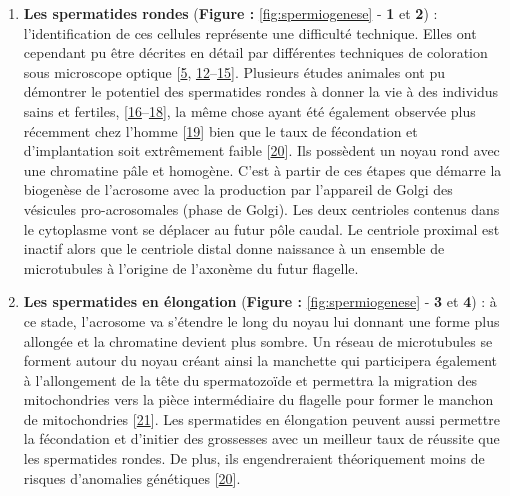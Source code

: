 \documentclass[12pt,twoside]{reedthesis}
\theoremstyle{definition}
\theoremstyle{definition}
\theoremstyle{remark}
\begin{document}
  \begin{enumerate}
  \def\labelenumi{\arabic{enumi}.}
  \item
    \textbf{Les spermatides rondes} (\textbf{Figure :
    }\ref{fig:spermiogenese} - \textbf{1} et \textbf{2}) :
    l'identification de ces cellules représente une difficulté technique.
    Elles ont cependant pu être décrites en détail par différentes
    techniques de coloration sous microscope optique
    {[}\protect\hyperlink{ref-Clermont1963}{5},
    \protect\hyperlink{ref-Papic}{12}--\protect\hyperlink{ref-WorldHealthOrganization1992}{15}{]}.
    Plusieurs études animales ont pu démontrer le potentiel des
    spermatides rondes à donner la vie à des individus sains et fertiles,
    {[}\protect\hyperlink{ref-Ogura1994}{16}--\protect\hyperlink{ref-Sasagawa}{18}{]},
    la même chose ayant été également observée plus récemment chez l'homme
    {[}\protect\hyperlink{ref-Tanaka2015}{19}{]} bien que le taux de
    fécondation et d'implantation soit extrêmement faible
    {[}\protect\hyperlink{ref-Asimakopoulos2003}{20}{]}. Ils possèdent un
    noyau rond avec une chromatine pâle et homogène. C'est à partir de ces
    étapes que démarre la biogenèse de l'acrosome avec la production par
    l'appareil de Golgi des vésicules pro-acrosomales (phase de Golgi).
    Les deux centrioles contenus dans le cytoplasme vont se déplacer au
    futur pôle caudal. Le centriole proximal est inactif alors que le
    centriole distal donne naissance à un ensemble de microtubules à
    l'origine de l'axonème du futur flagelle.
  \item
    \textbf{Les spermatides en élongation} (\textbf{Figure :
    }\ref{fig:spermiogenese} - \textbf{3} et \textbf{4}) : à ce stade,
    l'acrosome va s'étendre le long du noyau lui donnant une forme plus
    allongée et la chromatine devient plus sombre. Un réseau de
    microtubules se forment autour du noyau créant ainsi la manchette qui
    participera également à l'allongement de la tête du spermatozoïde et
    permettra la migration des mitochondries vers la pièce intermédiaire
    du flagelle pour former le manchon de mitochondries
    {[}\protect\hyperlink{ref-Moreno2006}{21}{]}. Les spermatides en
    élongation peuvent aussi permettre la fécondation et d'initier des
    grossesses avec un meilleur taux de réussite que les spermatides
    rondes. De plus, ils engendreraient théoriquement moins de risques
    d'anomalies génétiques
    {[}\protect\hyperlink{ref-Asimakopoulos2003}{20}{]}.
  \end{enumerate}
  
\end{document}
